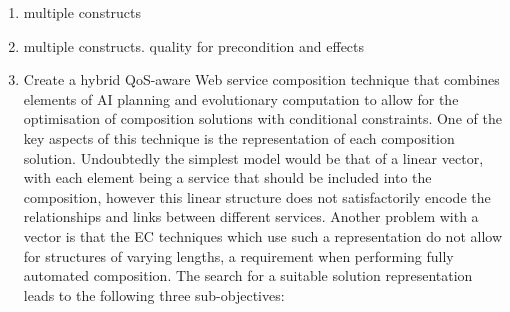 \begin{enumerate}
   \item multiple constructs 
 \item multiple constructs. quality for precondition and effects
  \item \label{obj:rep} Create a hybrid QoS-aware Web service composition technique that combines elements of AI planning and evolutionary computation to allow for the optimisation of composition solutions with conditional constraints. One of the key aspects of this technique is the representation of each composition solution. Undoubtedly the simplest model would be that of a linear vector, with each element being a service that should be included into the composition, however this linear structure does not satisfactorily encode the relationships and links between different services. Another problem with a vector is that the EC techniques which use such a representation do not allow for structures of varying lengths, a requirement when performing fully automated composition. The search for a suitable solution representation leads to the following three sub-objectives:
  

\end{enumerate}
